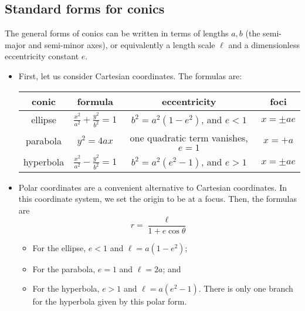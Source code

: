 \subsection{Standard forms for conics}
The general forms of conics can be written in terms of lengths \(a, b\) (the semi-major and semi-minor axes), or equivalently a length scale \(\ell\) and a dimensionless eccentricity constant \(e\).
\begin{itemize}
	\item First, let us consider Cartesian coordinates.
	      The formulas are:

	      \medskip\noindent\begin{tabular}{cccc}
		      conic     & formula                                   & eccentricity                         & foci         \\\midrule
		      ellipse   & \(\frac{x^2}{a^2} + \frac{y^2}{b^2} = 1\) & \(b^2=a^2(1-e^2)\), and \(e<1\)      & \(x=\pm ae\) \\
		      parabola  & \(y^2 = 4ax\)                             & one quadratic term vanishes, \(e=1\) & \(x = +a\)   \\
		      hyperbola & \(\frac{x^2}{a^2} - \frac{y^2}{b^2} = 1\) & \(b^2=a^2(e^2-1)\), and \(e>1\)      & \(x=\pm ae\)
	      \end{tabular}

	\item Polar coordinates are a convenient alternative to Cartesian coordinates.
	      In this coordinate system, we set the origin to be at a focus.
	      Then, the formulas are
	      \[
		      r = \frac{\ell}{1 + e\cos \theta}
	      \]
	      \begin{itemize}
		      \item For the ellipse, \(e<1\) and \(\ell = a(1-e^2)\);
		      \item For the parabola, \(e=1\) and \(\ell = 2a\); and
		      \item For the hyperbola, \(e>1\) and \(\ell = a(e^2 - 1)\).
		            There is only one branch for the hyperbola given by this polar form.
	      \end{itemize}
\end{itemize}


